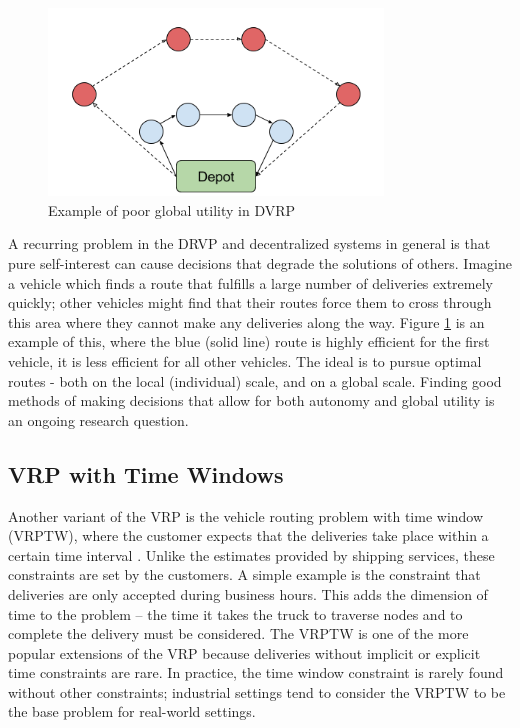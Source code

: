 \documentclass{sig-alternate}
\begin{document}
\begin{figure}[t]
\centering
\includegraphics[width=3.5in, keepaspectratio]{Utility.png}
\caption{Example of poor global utility in DVRP}
\label{fig:DVRPgraph}
\end{figure}
 A recurring problem in the DRVP and decentralized systems in general is that pure self-interest can cause decisions that degrade the solutions of others. Imagine a vehicle which finds a route that fulfills a large number of deliveries extremely quickly; other vehicles might find that their routes force them to cross through this area where they cannot make any deliveries along the way. Figure \ref{fig:DVRPgraph} is an example of this, where the blue (solid line) route is highly efficient for the first vehicle, it is less efficient for all other vehicles. The ideal is to pursue optimal routes - both on the local (individual) scale, and on a global scale. Finding good methods of making decisions that allow for both autonomy and global utility is an ongoing research question. 
\subsection{VRP with Time Windows}
Another variant of the VRP is the vehicle routing problem with time window (VRPTW), where the customer expects that the deliveries take place within a certain time interval \cite{Caceres-Cruz:2014}. Unlike the estimates provided by shipping services, these constraints are set by the customers. A simple example is the constraint that deliveries are only accepted during business hours. This adds the dimension of time to the problem -- the time it takes the truck to traverse nodes and to complete the delivery must be considered. The VRPTW is one of the more popular extensions of the VRP because deliveries without implicit or explicit time constraints are rare. In practice, the time window constraint is rarely found without other constraints; industrial settings tend to consider the VRPTW to be the base problem for real-world settings. 
\end{document}

